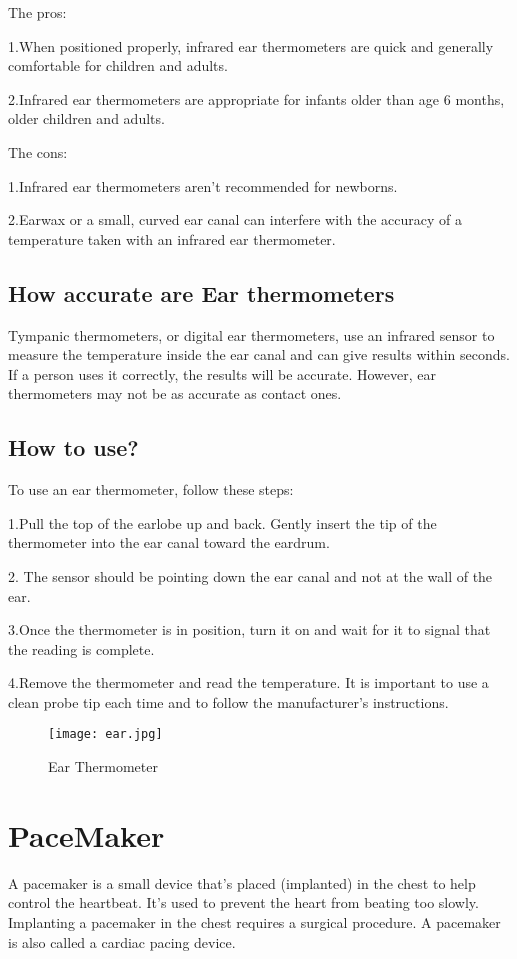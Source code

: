 \documentclass[12pt]{report}
\begin{document}
The pros:

1.When positioned properly, infrared ear thermometers are quick and generally comfortable for children and adults.\

2.Infrared ear thermometers are appropriate for infants older than age 6 months, older children and adults.\

The cons:

1.Infrared ear thermometers aren't recommended for newborns.\

2.Earwax or a small, curved ear canal can interfere with the accuracy of a temperature taken with an infrared ear thermometer.\

\subsection{How accurate are Ear thermometers}
Tympanic thermometers, or digital ear thermometers, use an infrared sensor to measure the temperature inside the ear canal and can give results within seconds. If a person uses it correctly, the results will be accurate. However, ear thermometers may not be as accurate as contact ones.

\subsection{How to use?}
To use an ear thermometer, follow these steps:

1.Pull the top of the earlobe up and back.
Gently insert the tip of the thermometer into the ear canal toward the eardrum.\

2. The sensor should be pointing down the ear canal and not at the wall of the ear.\

3.Once the thermometer is in position, turn it on and wait for it to signal that the reading is complete.\

4.Remove the thermometer and read the temperature.
It is important to use a clean probe tip each time and to follow the manufacturer’s instructions.

\begin{figure}[h]
\centering
\texttt{[image: ear.jpg]}
\caption{Ear Thermometer}
\end{figure}
\clearpage

\section{PaceMaker}
A pacemaker is a small device that's placed (implanted) in the chest to help control the heartbeat. It's used to prevent the heart from beating too slowly. Implanting a pacemaker in the chest requires a surgical procedure. A pacemaker is also called a cardiac pacing device.\
\end{document}
